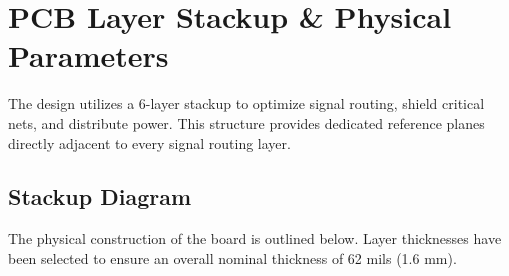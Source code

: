 \documentclass[11pt,a4paper]{article}
\begin{document}
\begin{center}
\end{center}

\newpage

\section{PCB Layer Stackup \& Physical Parameters}
The design utilizes a 6-layer stackup to optimize signal routing, shield critical nets, and distribute power. This structure provides dedicated reference planes directly adjacent to every signal routing layer.

\subsection{Stackup Diagram}
The physical construction of the board is outlined below. Layer thicknesses have been selected to ensure an overall nominal thickness of 62 mils (1.6 mm).
\end{document}
